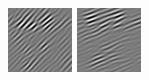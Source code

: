 \begin{figure}[ht]
\begin{center}
  \includegraphics[width=\columnwidth/9]{ch4/figures/real_0_2.jpg}
  \includegraphics[width=\columnwidth/9]{ch4/figures/real_0_3.jpg}

\end{center}
\end{figure}
